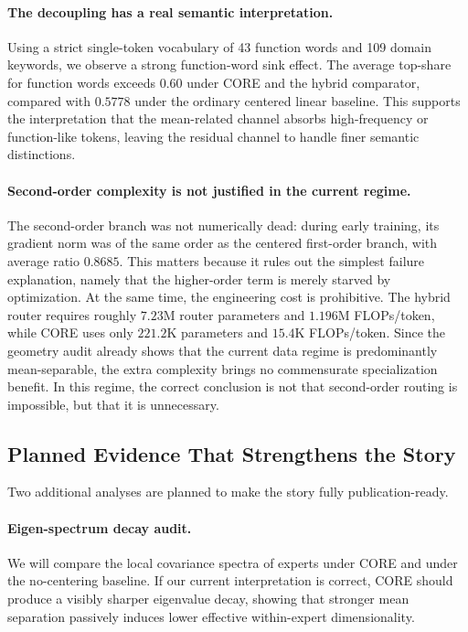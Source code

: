 \paragraph{The decoupling has a real semantic interpretation.}
Using a strict single-token vocabulary of 43 function words and 109 domain keywords, we observe a strong function-word sink effect. The average top-share for function words exceeds $0.60$ under CORE and the hybrid comparator, compared with $0.5778$ under the ordinary centered linear baseline. This supports the interpretation that the mean-related channel absorbs high-frequency or function-like tokens, leaving the residual channel to handle finer semantic distinctions.

\paragraph{Second-order complexity is not justified in the current regime.}
The second-order branch was not numerically dead: during early training, its gradient norm was of the same order as the centered first-order branch, with average ratio $0.8685$. This matters because it rules out the simplest failure explanation, namely that the higher-order term is merely starved by optimization. At the same time, the engineering cost is prohibitive. The hybrid router requires roughly $7.23$M router parameters and $1.196$M FLOPs/token, while CORE uses only $221.2$K parameters and $15.4$K FLOPs/token. Since the geometry audit already shows that the current data regime is predominantly mean-separable, the extra complexity brings no commensurate specialization benefit. In this regime, the correct conclusion is not that second-order routing is impossible, but that it is unnecessary.

\subsection{Planned Evidence That Strengthens the Story}
Two additional analyses are planned to make the story fully publication-ready.

\paragraph{Eigen-spectrum decay audit.}
We will compare the local covariance spectra of experts under CORE and under the no-centering baseline. If our current interpretation is correct, CORE should produce a visibly sharper eigenvalue decay, showing that stronger mean separation passively induces lower effective within-expert dimensionality.

